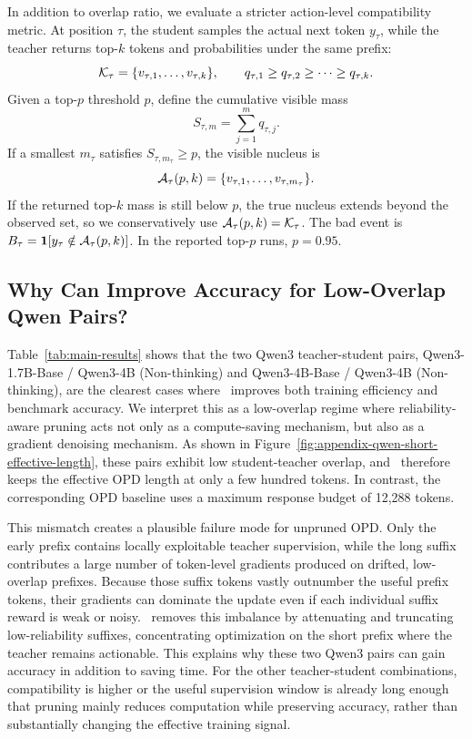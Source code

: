 In addition to overlap ratio, we evaluate a stricter action-level compatibility metric.
At position $\tau$, the student samples the actual next token $y_{\tau}$, while the teacher returns top-$k$ tokens and probabilities under the same prefix:
\begin{equation}
    \mathcal{K}_{\tau} = \{v_{\tau,1}, \ldots, v_{\tau,k}\}, \qquad
    q_{\tau,1} \geq q_{\tau,2} \geq \cdots \geq q_{\tau,k}.
\end{equation}
Given a top-$p$ threshold $p$, define the cumulative visible mass
\begin{equation}
    S_{\tau,m} = \sum_{j=1}^{m} q_{\tau,j}.
\end{equation}
If a smallest $m_{\tau}$ satisfies $S_{\tau,m_{\tau}}\geq p$, the visible nucleus is
\begin{equation}
    \mathcal{A}_{\tau}(p,k)=\{v_{\tau,1},\ldots,v_{\tau,m_{\tau}}\}.
\end{equation}
If the returned top-$k$ mass is still below $p$, the true nucleus extends beyond the observed set, so we conservatively use $\mathcal{A}_{\tau}(p,k)=\mathcal{K}_{\tau}$.
The bad event is $B_{\tau}=\mathbf{1}[y_{\tau}\notin\mathcal{A}_{\tau}(p,k)]$.
In the reported top-$p$ runs, $p=0.95$.





\subsection{Why \method Can Improve Accuracy for Low-Overlap Qwen Pairs?}
\label{app:qwen-low-overlap}

Table~\ref{tab:main-results} shows that the two Qwen3 teacher-student pairs, Qwen3-1.7B-Base / Qwen3-4B (Non-thinking) and Qwen3-4B-Base / Qwen3-4B (Non-thinking), are the clearest cases where \method~improves both training efficiency and benchmark accuracy.
We interpret this as a low-overlap regime where reliability-aware pruning acts not only as a compute-saving mechanism, but also as a gradient denoising mechanism.
As shown in Figure~\ref{fig:appendix-qwen-short-effective-length}, these pairs exhibit low student-teacher overlap, and \method~therefore keeps the effective OPD length at only a few hundred tokens.
In contrast, the corresponding OPD baseline uses a maximum response budget of 12,288 tokens.

This mismatch creates a plausible failure mode for unpruned OPD.
Only the early prefix contains locally exploitable teacher supervision, while the long suffix contributes a large number of token-level gradients produced on drifted, low-overlap prefixes.
Because those suffix tokens vastly outnumber the useful prefix tokens, their gradients can dominate the update even if each individual suffix reward is weak or noisy.
\method~removes this imbalance by attenuating and truncating low-reliability suffixes, concentrating optimization on the short prefix where the teacher remains actionable.
This explains why these two Qwen3 pairs can gain accuracy in addition to saving time.
For the other teacher-student combinations, compatibility is higher or the useful supervision window is already long enough that pruning mainly reduces computation while preserving accuracy, rather than substantially changing the effective training signal.

